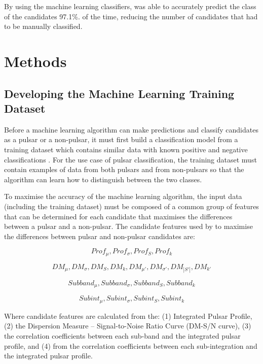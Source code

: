 \documentclass{article}
\begin{document}
By using the machine learning classifiers, \textcite{lyon} was able to accurately predict the class of the candidates 97.1\%. of the time, reducing the number of candidates that had to be manually classified.

\pagebreak
\section{Methods}
\subsection{Developing the Machine Learning Training Dataset}

Before a machine learning algorithm can make predictions and classify candidates as a pulsar or a non-pulsar, it must first build a classification model from a training dataset which contains similar data with known positive and negative classifications \autocite{tan, lyon}. For the use case of pulsar classification, the training dataset must contain examples of data from both pulsars and from non-pulsars so that the algorithm can learn how to distinguish between the two classes.

To maximise the accuracy of the machine learning algorithm, the input data (including the training dataset) must be composed of a common group of features that can be determined for each candidate that maximises the differences between a pulsar and a non-pulsar. The candidate features used by \textcite{tan} to maximise the differences between pulsar and non-pulsar candidates are:

\begin{equation}
    Prof_{\mu}, Prof_{\sigma}, Prof_{S}, Prof_{k}
\end{equation}

\begin{equation}
    DM_{\mu}, DM_{\sigma}, DM_{S},DM_{k},
    DM_{\mu'}, DM_{\sigma'}, DM_{|S'|},DM_{k'}
\end{equation}

\begin{equation}
    Subband_{\mu}, Subband_{\sigma}, Subband_{S}, Subband_{k}
\end{equation}

\begin{equation}
    Subint_{\mu}, Subint_{\sigma}, Subint_{S}, Subint_{k}
\end{equation}

Where candidate features are calculated from the: (1) Integrated Pulsar Profile, (2) the Dispersion Measure -- Signal-to-Noise Ratio Curve (DM-S/N curve), (3) the correlation coefficients between each sub-band and the integrated pulsar profile, and (4) from the correlation coefficients between each sub-integration and the integrated pulsar profile. 
\end{document}
